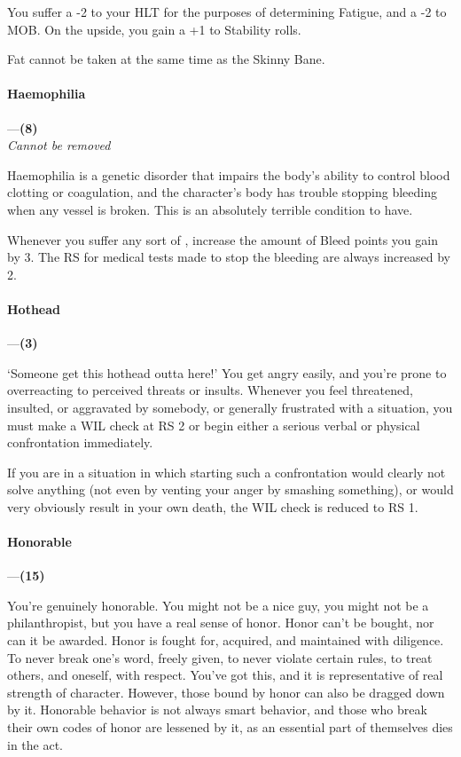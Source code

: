 \documentclass[oneside,11pt,english]{book}
\begin{document}
You suffer a -2 to your HLT for the purposes of determining Fatigue, and a -2 to MOB. 
On the upside, you gain a +1 to Stability rolls. 


Fat cannot be taken at the same time as the Skinny Bane.
\paragraph{\label{bane:Haemophilia}Haemophilia}---\quad\textbf{(8) }\\
\textit{Cannot be removed}\par
Haemophilia is a genetic disorder that impairs the body’s ability to control blood clotting or coagulation, 
and the character’s body has trouble stopping bleeding when any vessel is broken. This is an absolutely 
terrible condition to have. 


Whenever you suffer any sort of , increase the amount of Bleed points you gain by 3. The RS 
for medical tests made to stop the bleeding are always increased by 2. 


\paragraph{\label{bane:Hothead}Hothead}---\quad\textbf{(3) }\par
‘Someone get this hothead outta here!’ You get angry easily, and you're prone to overreacting to 
perceived threats or insults. Whenever you feel threatened, insulted, or aggravated by somebody, or 
generally frustrated with a situation, you must make a WIL check at RS 2 or begin either a serious verbal 
or physical confrontation immediately. 


If you are in a situation in which starting such a confrontation would clearly not solve anything (not even 
by venting your anger by smashing something), or would very obviously result in your own death, the 
WIL check is reduced to RS 1. 


\paragraph{\label{bane:Honorable}Honorable}---\quad\textbf{(15) }\par
You're genuinely honorable. You might not be a nice guy, you might not be a philanthropist, but you have 
a real sense of honor. Honor can't be bought, nor can it be awarded. Honor is fought for, acquired, and 
maintained with diligence. To never break one's word, freely given, to never violate certain rules, to treat 
others, and oneself, with respect. You've got this, and it is representative of real strength of character. 
However, those bound by honor can also be dragged down by it. Honorable behavior is not always smart 
behavior, and those who break their own codes of honor are lessened by it, as an essential part of 
themselves dies in the act. 
\end{document}
